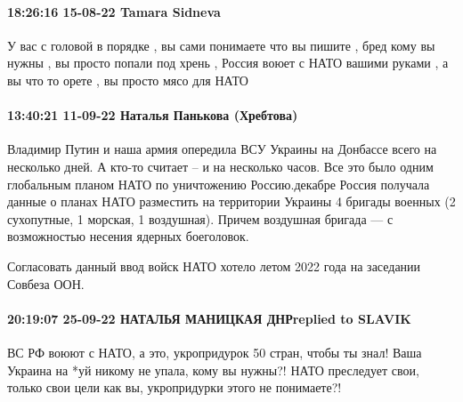  
 
 
 
 

\paragraph{18:26:16 15-08-22 Tamara Sidneva}

У вас с головой в порядке , вы сами понимаете что вы пишите , бред кому вы
нужны , вы просто попали под хрень , Россия воюет с НАТО вашими руками , а вы
что то орете , вы просто мясо для НАТО

\paragraph{13:40:21 11-09-22 Наталья Панькова (Хребтова)}

Владимир Путин и наша армия опередила ВСУ Украины на Донбассе всего на
несколько дней. А кто-то считает – и на несколько часов. Все это было одним
глобальным планом НАТО по уничтожению Россию.декабре Россия получала данные о
планах НАТО разместить на территории Украины 4 бригады военных (2 сухопутные, 1
морская, 1 воздушная). Причем воздушная бригада — с возможностью несения
ядерных боеголовок.

Согласовать данный ввод войск НАТО хотело летом 2022 года на заседании Совбеза
ООН.

\paragraph{20:19:07 25-09-22 НАТАЛЬЯ МАНИЦКАЯ ДНРreplied to SLAVIK}

ВС РФ воюют с НАТО, а это, укропридурок 50 стран, чтобы ты знал! Ваша Украина
на *уй никому не упала, кому вы нужны?! НАТО преследует свои, только свои цели
как вы, укропридурки этого не понимаете?!

